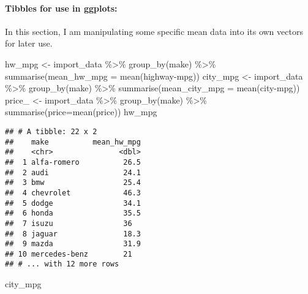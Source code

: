 \documentclass[
]{article}
\newenvironment{Shaded}{\begin{snugshade}}{\end{snugshade}}
\newcommand{\AttributeTok}[1]{\textcolor[rgb]{0.77,0.63,0.00}{#1}}
\newcommand{\FunctionTok}[1]{\textcolor[rgb]{0.00,0.00,0.00}{#1}}
\newcommand{\NormalTok}[1]{#1}
\newcommand{\OtherTok}[1]{\textcolor[rgb]{0.56,0.35,0.01}{#1}}
\newcommand{\SpecialCharTok}[1]{\textcolor[rgb]{0.00,0.00,0.00}{#1}}
\newcommand{\StringTok}[1]{\textcolor[rgb]{0.31,0.60,0.02}{#1}}
\begin{document}
\hypertarget{tibbles-for-use-in-ggplots}{%
\paragraph{Tibbles for use in
ggplots:}\label{tibbles-for-use-in-ggplots}}

In this section, I am manipulating some specific mean data into its own
vectors for later use.

\begin{Shaded}
\begin{Highlighting}[]
\NormalTok{hw\_mpg }\OtherTok{\textless{}{-}}\NormalTok{ import\_data }\SpecialCharTok{\%\textgreater{}\%} \FunctionTok{group\_by}\NormalTok{(make) }\SpecialCharTok{\%\textgreater{}\%} \FunctionTok{summarise}\NormalTok{(}\AttributeTok{mean\_hw\_mpg =} \FunctionTok{mean}\NormalTok{(}\StringTok{\textasciigrave{}}\AttributeTok{highway{-}mpg}\StringTok{\textasciigrave{}}\NormalTok{))}
\NormalTok{city\_mpg }\OtherTok{\textless{}{-}}\NormalTok{ import\_data }\SpecialCharTok{\%\textgreater{}\%} \FunctionTok{group\_by}\NormalTok{(make) }\SpecialCharTok{\%\textgreater{}\%} \FunctionTok{summarise}\NormalTok{(}\AttributeTok{mean\_city\_mpg =} \FunctionTok{mean}\NormalTok{(}\StringTok{\textasciigrave{}}\AttributeTok{city{-}mpg}\StringTok{\textasciigrave{}}\NormalTok{))}
\NormalTok{price\_ }\OtherTok{\textless{}{-}}\NormalTok{ import\_data }\SpecialCharTok{\%\textgreater{}\%} \FunctionTok{group\_by}\NormalTok{(make) }\SpecialCharTok{\%\textgreater{}\%} \FunctionTok{summarise}\NormalTok{(}\AttributeTok{price=}\FunctionTok{mean}\NormalTok{(}\StringTok{\textasciigrave{}}\AttributeTok{price}\StringTok{\textasciigrave{}}\NormalTok{))}
\NormalTok{hw\_mpg}
\end{Highlighting}
\end{Shaded}

\begin{verbatim}
## # A tibble: 22 x 2
##    make          mean_hw_mpg
##    <chr>               <dbl>
##  1 alfa-romero          26.5
##  2 audi                 24.1
##  3 bmw                  25.4
##  4 chevrolet            46.3
##  5 dodge                34.1
##  6 honda                35.5
##  7 isuzu                36  
##  8 jaguar               18.3
##  9 mazda                31.9
## 10 mercedes-benz        21  
## # ... with 12 more rows
\end{verbatim}

\begin{Shaded}
\begin{Highlighting}[]
\NormalTok{city\_mpg}
\end{Highlighting}
\end{Shaded}
\end{document}
